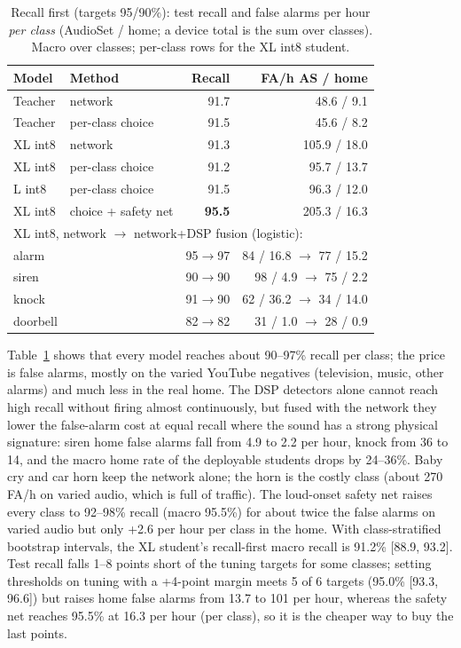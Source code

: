 \documentclass[conference]{IEEEtran}
\begin{document}
\begin{table}[t]\centering\caption{Recall first (targets 95/90\%): test recall and false alarms
per hour \emph{per class} (AudioSet / home; a device total is the sum over classes). Macro over
classes; per-class rows for the XL int8 student.}\label{tab:p5}
\setlength{\tabcolsep}{3pt}
\begin{tabular}{llrr}\toprule
Model & Method & Recall & FA/h AS / home \\ \midrule
Teacher & network & 91.7 & 48.6 / 9.1 \\
Teacher & per-class choice & 91.5 & 45.6 / 8.2 \\
XL int8 & network & 91.3 & 105.9 / 18.0 \\
XL int8 & per-class choice & 91.2 & 95.7 / 13.7 \\
L int8 & per-class choice & 91.5 & 96.3 / 12.0 \\
XL int8 & choice + safety net & \textbf{95.5} & 205.3 / 16.3 \\ \midrule
\multicolumn{4}{l}{XL int8, network $\to$ network+DSP fusion (logistic):} \\
alarm & & 95$\to$97 & 84 / 16.8 $\to$ 77 / 15.2 \\
siren & & 90$\to$90 & 98 / 4.9 $\to$ 75 / 2.2 \\
knock & & 91$\to$90 & 62 / 36.2 $\to$ 34 / 14.0 \\
doorbell & & 82$\to$82 & 31 / 1.0 $\to$ 28 / 0.9 \\ \bottomrule
\end{tabular}\end{table}

Table~\ref{tab:p5} shows that every model reaches about 90--97\% recall per class; the price is
false alarms, mostly on the varied YouTube negatives (television, music, other alarms) and much
less in the real home. The DSP detectors alone cannot reach high recall without firing almost
continuously, but fused with the network they lower the false-alarm cost at equal recall where
the sound has a strong physical signature: siren home false alarms fall from 4.9 to 2.2 per hour,
knock from 36 to 14, and the macro home rate of the deployable students drops by 24--36\%.
Baby cry and car horn keep the network alone; the horn is the costly class (about 270 FA/h on
varied audio, which is full of traffic). The loud-onset safety net raises every class to
92--98\% recall (macro 95.5\%) for about twice the false alarms on varied audio but only
+2.6 per hour per class in the home. With class-stratified bootstrap intervals, the XL student's
recall-first macro recall is 91.2\% [88.9, 93.2]. Test recall falls 1--8 points short of the
tuning targets for some classes; setting thresholds on tuning with a +4-point margin meets 5 of
6 targets (95.0\% [93.3, 96.6]) but raises home false alarms from 13.7 to 101 per hour, whereas
the safety net reaches 95.5\% at 16.3 per hour (per class), so it is the cheaper way to buy the
last points.
\end{document}
